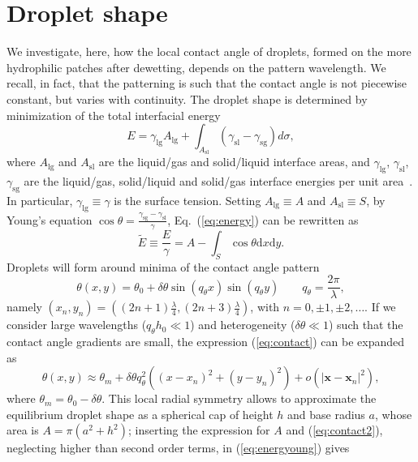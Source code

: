 \documentclass[amsmath,amssymb,showpacs,prf,superscriptaddress,notitlepage,longbibliography]{revtex4-1}
\begin{document}
\section{Droplet shape}\label{sec:SMdroplet}

\noindent We investigate, here, how the local contact angle of droplets, formed on the more hydrophilic patches after dewetting, depends on the pattern wavelength. 
We recall, in fact, that the patterning is such that the contact angle is not piecewise constant, but varies with continuity.
The droplet shape is determined by minimization of the total interfacial energy
\begin{equation}\label{eq:energy}
E = \gamma_{\text{lg}} A_{\text{lg}} + \int_{A_{\text{sl}}} (\gamma_{\text{sl}} - \gamma_{\text{sg}})d \sigma,
\end{equation}
where $A_{\text{lg}}$ and $A_{\text{sl}}$ are the liquid/gas and solid/liquid interface areas, and $\gamma_{\text{lg}}$, $\gamma_{\text{sl}}$, $\gamma_{\text{sg}}$ are the liquid/gas, solid/liquid and solid/gas interface energies per unit area~\cite{wuHowChemicalPatterns2020}. 
In particular, $\gamma_{\text{lg}} \equiv \gamma$ is the surface tension.
Setting $A_{\text{lg}} \equiv A$ and $A_{\text{sl}} \equiv S$, by Young's equation $\cos \theta = \frac{\gamma_{\text{sg}} - \gamma_{\text{sl}}}{\gamma}$, Eq.~(\ref{eq:energy}) can be rewritten as
\begin{equation}\label{eq:energyoung}
\tilde{E} \equiv \frac{E}{\gamma} = A - \int_S \cos \theta \text{d}x \text{d}y.
\end{equation}
Droplets will form around minima of the contact angle pattern
\begin{equation}\label{eq:contact}
\theta(x,y) = \theta_0 + \delta \theta \sin(q_{\theta} x) \sin (q_{\theta} y) \qquad q_{\theta} = \frac{2\pi}{\lambda},
\end{equation}
namely $(x_n,y_n) = \left((2n+1)\frac{\lambda}{4},(2n+3)\frac{\lambda}{4}\right)$, with $n=0,\pm 1, \pm 2,\dots$.
If we consider large wavelengths ($q_{\theta} h_0 \ll 1$) and heterogeneity ($\delta \theta \ll 1$) such that the contact angle gradients are small, the expression (\ref{eq:contact}) can be expanded as
\begin{equation}\label{eq:contact2}
\theta(x,y) \approx \theta_m + \delta \theta q_{\theta}^2 ((x-x_n)^2 + (y - y_n)^2) + o(|\mathbf{x}-\mathbf{x}_n|^2),
\end{equation}
where $\theta_m = \theta_0 - \delta \theta$.
This local radial symmetry allows to approximate the equilibrium droplet shape as a spherical cap of height $h$ and base radius $a$, whose area is $A = \pi(a^2 + h^2)$; inserting the expression for $A$ and (\ref{eq:contact2}), neglecting higher than second order terms, in (\ref{eq:energyoung}) gives
\end{document}
